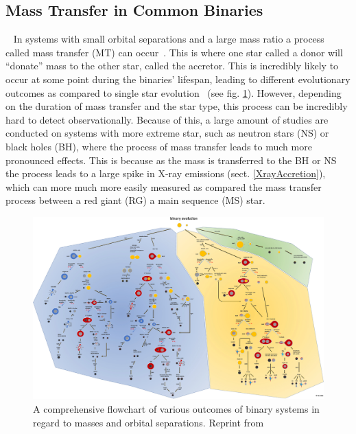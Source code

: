 \documentclass[12pt, a4paper]{article}
\begin{document}
    \subsection{Mass Transfer in Common Binaries}~\label{MassTransferinCommon}
    In systems with small orbital separations and a large mass ratio a process called mass transfer (MT) can occur~\cite{TaurisvandenHeuvel+2023}. This is where one star called a donor will ``donate'' mass to the other star, called the accretor. This is incredibly likely to occur at some point during the binaries' lifespan, leading to different evolutionary outcomes as compared to single star evolution~\cite{TaurisvandenHeuvel+2023} (see fig. \ref{fig:binary_evolution_flowchart}). However, depending on the duration of mass transfer and the star type, this process can be incredibly hard to detect observationally. Because of this, a large amount of studies are conducted on systems with more extreme star, such as neutron stars (NS) or black holes (BH), where the process of mass transfer leads to much more pronounced effects. This is because as the mass is transferred to the BH or NS the process leads to a large spike in X-ray emissions (sect. \ref{XrayAccretion}), which can more much more easily measured as compared the mass transfer process between a red giant (RG) a main sequence (MS) star.

    \vspace*{\fill}
    \begin{figure}[H]
        \centering
        \includegraphics[width=\textwidth]{figs/Binary Evolution Flowchart.jpg}
        \caption{A comprehensive flowchart of various outcomes of binary systems in regard to masses and orbital separations. Reprint from \cite{Chen_2024}}
        \label{fig:binary_evolution_flowchart}
    \end{figure}
    \vspace*{\fill}
    \restoregeometry
\end{document}
